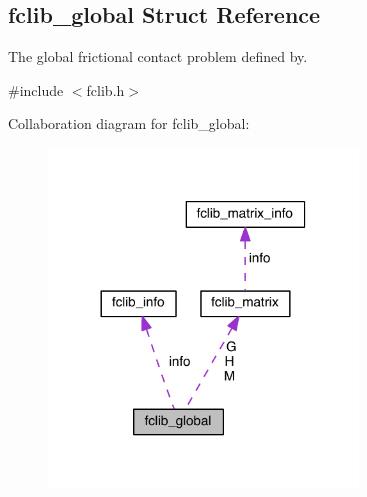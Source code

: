 \hypertarget{structfclib__global}{}\subsection{fclib\+\_\+global Struct Reference}
\label{structfclib__global}


The global frictional contact problem defined by.  




{\ttfamily \#include $<$fclib.\+h$>$}



Collaboration diagram for fclib\+\_\+global\+:
\nopagebreak
\begin{figure}[H]
\begin{center}
\leavevmode
\includegraphics[width=233pt]{structfclib__global__coll__graph}
\end{center}
\end{figure}
